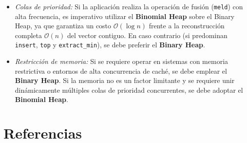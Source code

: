 \documentclass[11pt,letterpaper]{article}
\begin{document}
\begin{enumerate}
\begin{itemize}
        La \textit{Búsqueda Secuencial} no es particularmente recomendable en ningún escenario, al tener un costo lineal $\mathcal{O}(n)$ que la hace ineficiente frente a las alternativas logarítmicas. Sin embargo cabe recalcar que esta sigue ganando en otros entornos, como por ejemplo cuando se trabaja con secuencias no ordenadas, ya que de los algoritmos estudiados es el único que no requiere ordenamiento previo.
        \item \textit{Colas de prioridad:} Si la aplicación realiza la operación de fusión (\texttt{meld}) con alta frecuencia, es imperativo utilizar el \textbf{Binomial Heap} sobre el Binary Heap, ya que garantiza un costo $\mathcal{O}(\log n)$ frente a la reconstrucción completa $\mathcal{O}(n)$ del vector contiguo. En caso contrario (si predominan \texttt{insert}, \texttt{top} y \texttt{extract\_min}), se debe preferir el \textbf{Binary Heap}.
        \item \textit{Restricción de memoria:} Si se requiere operar en sistemas con memoria restrictiva o entornos de alta concurrencia de caché, se debe emplear el \textbf{Binary Heap}. Si la memoria no es un factor limitante y se requiere unir dinámicamente múltiples colas de prioridad concurrentes, se debe adoptar el \textbf{Binomial Heap}.
    \end{itemize}
\end{enumerate}


\newpage
\section{Referencias}
\end{document}
